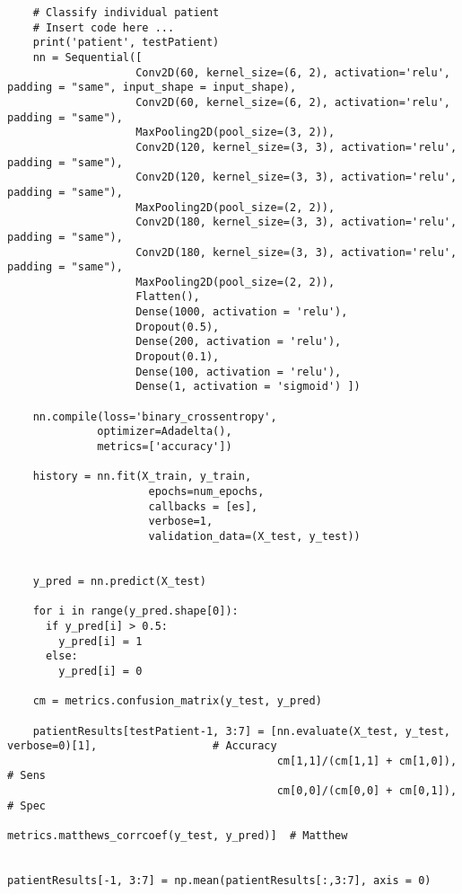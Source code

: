 \documentclass[11pt]{article}
\begin{document}
\begin{verbatim}
    # Classify individual patient
    # Insert code here ...
    print('patient', testPatient)
    nn = Sequential([ 
                    Conv2D(60, kernel_size=(6, 2), activation='relu', padding = "same", input_shape = input_shape),
                    Conv2D(60, kernel_size=(6, 2), activation='relu', padding = "same"),
                    MaxPooling2D(pool_size=(3, 2)),
                    Conv2D(120, kernel_size=(3, 3), activation='relu', padding = "same"),
                    Conv2D(120, kernel_size=(3, 3), activation='relu', padding = "same"),
                    MaxPooling2D(pool_size=(2, 2)),
                    Conv2D(180, kernel_size=(3, 3), activation='relu', padding = "same"),
                    Conv2D(180, kernel_size=(3, 3), activation='relu', padding = "same"),
                    MaxPooling2D(pool_size=(2, 2)),
                    Flatten(),
                    Dense(1000, activation = 'relu'),
                    Dropout(0.5),
                    Dense(200, activation = 'relu'),
                    Dropout(0.1),
                    Dense(100, activation = 'relu'),
                    Dense(1, activation = 'sigmoid') ])

    nn.compile(loss='binary_crossentropy',
              optimizer=Adadelta(),
              metrics=['accuracy'])

    history = nn.fit(X_train, y_train,
                      epochs=num_epochs,
                      callbacks = [es],
                      verbose=1,
                      validation_data=(X_test, y_test))


    y_pred = nn.predict(X_test)
    
    for i in range(y_pred.shape[0]):
      if y_pred[i] > 0.5:
        y_pred[i] = 1
      else:
        y_pred[i] = 0
    
    cm = metrics.confusion_matrix(y_test, y_pred)

    patientResults[testPatient-1, 3:7] = [nn.evaluate(X_test, y_test, verbose=0)[1],                  # Accuracy
                                          cm[1,1]/(cm[1,1] + cm[1,0]),                # Sens
                                          cm[0,0]/(cm[0,0] + cm[0,1]),                # Spec
                                          metrics.matthews_corrcoef(y_test, y_pred)]  # Matthew
    
    
patientResults[-1, 3:7] = np.mean(patientResults[:,3:7], axis = 0)


\end{verbatim}
\end{document}
